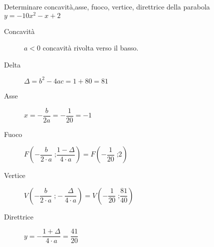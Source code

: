 	Determinare concavità,asse, fuoco, vertice, direttrice della parabola $y=-10x^2-x+2$
	\begin{description}
		\item[Concavità] $a<0$ concavità rivolta verso il basso.
		\item[Delta] $\Delta=b^2-4ac=1+80=81$
		\item[Asse] $x=-\dfrac{b}{2a}=-\dfrac{1}{20}=-1$
		\item[Fuoco] $F\left(-\dfrac{b}{2\cdot a}\;\text{;}\dfrac{1-\Delta}{4\cdot a}\right)=F\left(-\dfrac{1}{20}\;\text{;}2\right)$
		\item[Vertice] $V\left(-\dfrac{b}{2\cdot a}\;\text{;}-\dfrac{\Delta}{4\cdot a}\right)=V\left(-\dfrac{1}{20}\;\text{;}\dfrac{81}{40}\right)$
		\item[Direttrice] $y=-\dfrac{1+\Delta}{4\cdot a}=\dfrac{41}{20}$
	\end{description}

